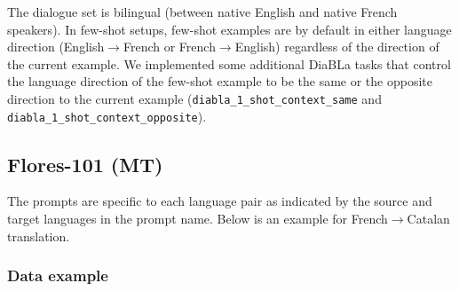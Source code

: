 \documentclass[twoside,11pt]{article}
\begin{document}

The dialogue set is bilingual (between native English and native French speakers). In few-shot setups, few-shot examples are by default in either language direction (English$\rightarrow$French or French$\rightarrow$English) regardless of the direction of the current example. We implemented some additional DiaBLa tasks that control the language direction of the few-shot example to be the same or the opposite direction to the current example (\texttt{diabla\_1\_shot\_context\_same} and \texttt{diabla\_1\_shot\_context\_opposite}).

\subsection{Flores-101 (MT)}
The prompts are specific to each language pair as indicated by the source and target languages in the prompt name. Below is an example for French$\rightarrow$Catalan translation.

\subsubsection{Data example}
\end{document}
